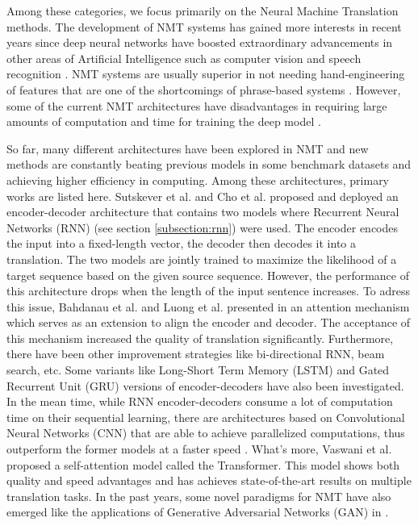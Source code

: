 Among these categories, we focus primarily on the Neural Machine Translation methods. The development of NMT systems has gained more interests in recent years since deep neural networks have boosted extraordinary advancements in other areas of Artificial Intelligence such as computer vision \cite{krizhevsky2012imagenet} and speech recognition \cite{dahl2012context}. NMT systems are usually superior in not needing hand-engineering of features that are one of the shortcomings of phrase-based systems \cite{Britz2017}. However, some of the current NMT architectures have disadvantages in requiring large amounts of computation and time for training the deep model \cite{Britz2017}.

So far, many different architectures have been explored in NMT and new methods are constantly beating previous models in some benchmark datasets and achieving higher efficiency in computing. Among these architectures, primary works are listed here. Sutskever et al. \cite{Sutskever2014} and Cho et al. \cite{Cho2014} proposed and deployed an encoder-decoder architecture that contains two models where Recurrent Neural Networks (RNN) (see section \ref{subsection:rnn}) were used. The encoder encodes the input into a fixed-length vector, the decoder then decodes it into a translation. The two models are jointly trained to maximize the likelihood of a target sequence based on the given source sequence. However, the performance of this architecture drops when the length of the input sentence increases. To adress this issue, Bahdanau et al. and Luong et al. presented in \cite{Bahdanau2014,Luong2015} an attention mechanism which serves as an extension to align the encoder and decoder. The acceptance of this mechanism increased the quality of translation significantly. Furthermore, there have been other improvement strategies like bi-directional RNN, beam search, etc. Some variants like Long-Short Term Memory (LSTM) \cite{hochreiter1997long} and Gated Recurrent Unit (GRU) \cite{Cho2014} versions of encoder-decoders have also been investigated. In the mean time, while RNN encoder-decoders consume a lot of computation time on their sequential learning, there are architectures based on Convolutional Neural Networks (CNN) that are able to achieve parallelized computations, thus outperform the former models at a faster speed \cite{Gehring2017}. What's more, Vaswani et al. \cite{Vaswani2017} proposed a self-attention model called the Transformer. This model shows both quality and speed advantages and has achieves state-of-the-art results on multiple translation tasks. In the past years, some novel paradigms for NMT have also emerged like the applications of Generative Adversarial Networks (GAN) in \cite{wu2017adversarial,yang2017improving}.

